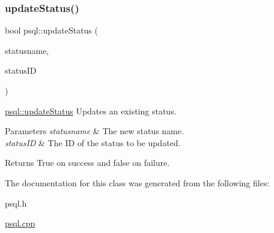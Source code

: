 \subsubsection{\texorpdfstring{update\+Status()}{updateStatus()}}
{\footnotesize\ttfamily bool psql\+::update\+Status (\begin{DoxyParamCaption}\item[{Q\+String}]{statusname,  }\item[{int}]{status\+ID }\end{DoxyParamCaption})}



\hyperlink{classpsql_a620364c99c98e20720908deb045536a0}{psql\+::update\+Status} Updates an existing status. 


\begin{DoxyParams}{Parameters}
{\em statusname} & The new status name. \\
\hline
{\em status\+ID} & The ID of the status to be updated. \\
\hline
\end{DoxyParams}
\begin{DoxyReturn}{Returns}
True on success and false on failure. 
\end{DoxyReturn}


The documentation for this class was generated from the following files\+:\begin{DoxyCompactItemize}
\item 
psql.\+h\item 
\hyperlink{psql_8cpp}{psql.\+cpp}\end{DoxyCompactItemize}
